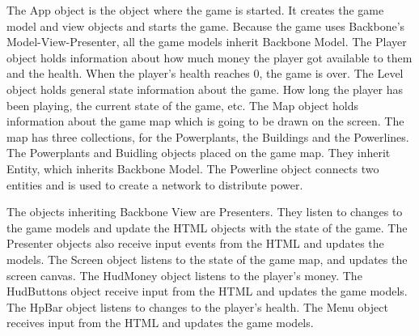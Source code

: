 	The App object is the object where the game is started. It creates the game model and view objects 
	and starts the game. Because the game uses Backbone's Model-View-Presenter, all the game models 
	inherit Backbone Model. The Player object holds information about how much money the player got 
	available to them and the health. When the player's health reaches 0, the game is over. The Level 
	object holds general state information about the game. How long the player has been playing, the 
	current state of the game, etc. The Map object holds information about the game map which is going 
	to be drawn on the screen. The map has three collections, for the Powerplants, the Buildings and 
	the Powerlines. The Powerplants and Buidling objects placed on the game map. They inherit Entity, 
	which inherits Backbone Model. The Powerline object connects two entities and is used to create a
	network to distribute power.

	The objects inheriting Backbone View are Presenters. They listen to changes to the game models and 
	update the HTML objects with the state of the game. The Presenter objects also receive input events
	from the HTML and updates the models. The Screen object listens to the state of the game map, and
	updates the screen canvas. The HudMoney object listens to the player's money. The HudButtons object 
	receive input from the HTML and updates the game models. The HpBar object listens to changes to the 
	player's health. The Menu object receives input from the HTML and updates the game models.

